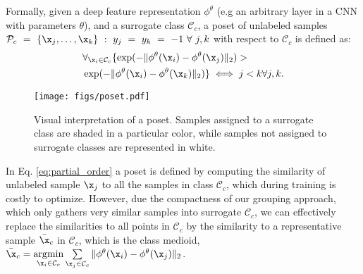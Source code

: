 \documentclass[10pt,twocolumn,letterpaper]{article}
\DeclareMathOperator*{\argmin}{\arg\!\min}
\begin{document}

Formally, given a deep feature representation $\phi^\theta$ (e.g an arbitrary layer in a CNN with parameters $\theta$), and a surrogate class $\mathcal{C}_c$, a poset of unlabeled samples $\mathcal{P}_c~=~\{\x_j,\dots, \x_k\}~:~y_j~=~y_k~=~-1~\forall~j,k$  with respect to $\mathcal{C}_c$ is defined as:
%
\begin{alignat}{2}\label{eq:partial_order}
&\forall_{\x_i \in \mathcal{C}_c} \{ \exp(-\| \phi^\theta(\x_i) - \phi^\theta(\x_j) \|_2) > \nonumber \\ 
&\exp (-\| \phi^\theta(\x_i) - \phi^\theta(\x_k) \|_2) \} \iff j < k \forall j,k.
\end{alignat}

\begin{figure}[!t]
\texttt{[image: figs/poset.pdf]}
\caption{Visual interpretation of a poset. Samples assigned to a surrogate class are shaded in a particular color, while samples not assigned to surrogate classes are represented in white.}
\label{fig:poset}
\end{figure}


In Eq. \eqref{eq:partial_order} a poset is defined by computing the similarity of unlabeled sample $\x_j$ to all the samples in class $\mathcal{C}_c$, which during training is costly to optimize. However, due the compactness of our grouping approach, which only gathers very similar samples into surrogate $\mathcal{C}_c$, we can effectively replace the similarities to all points in $\mathcal{C}_c$ by the similarity to a representative sample $\bar{\x}_c$ in $\mathcal{C}_c$, which is the class medioid, $ \bar{\x}_c = \argmin\limits_{\x_i \in \mathcal{C}_c} \sum\limits_{\x_j \in \mathcal{C}_c} \|\phi^\theta(\x_i) - \phi^\theta(\x_j) \|_2$. 
\end{document}
